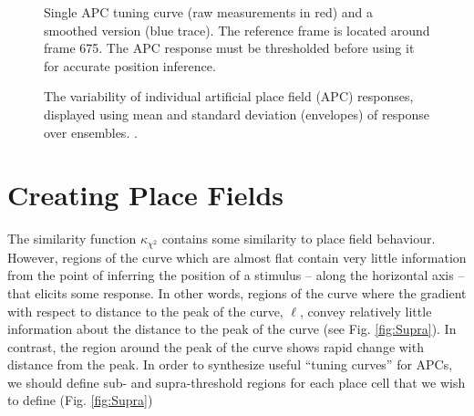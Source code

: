 %		

\begin{figure}[t]
\centering
 \setlength{}
	\setlength{}
		
		\label{fig:APCSingleNoisy}
\caption{Single APC tuning curve (raw measurements in red) and a smoothed version (blue trace).  The reference frame is located around frame 675. The APC response must be thresholded before using it for accurate position inference.}
\end{figure}








\begin{figure}
  \centering
  \setlength{}
  \setlength{}
  
  \caption{The variability of individual artificial place field (APC) responses, displayed using mean and standard deviation (envelopes) of response over ensembles. .}
  \label{fig:APCVariability}
\end{figure}



\section{Creating Place Fields}
The similarity function $\kappa_{\chi^2}$ contains some similarity to place field behaviour.  However, regions of the curve which are almost flat contain very little information from the point of inferring the position of a stimulus -- along the horizontal axis -- that elicits some response. In other words, regions of the curve where the gradient with respect to distance to the peak of the curve, $\ell$, convey relatively little information about the distance to the peak of the curve (see Fig. \ref{fig:Supra}). In contrast, the region around the peak of the curve shows rapid change with distance from the peak. In order to synthesize useful ``tuning curves'' for APCs, we should define sub- and supra-threshold regions for each place cell that we wish to define (Fig. \ref{fig:Supra})


